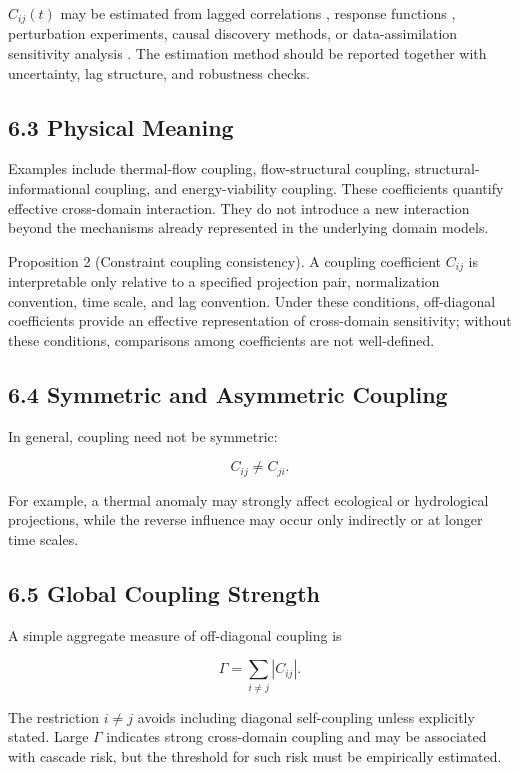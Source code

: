 \documentclass[aps,pre,reprint,superscriptaddress,nofootinbib]{revtex4-2}
\begin{document}
\(C_{ij}(t)\) may be estimated from lagged correlations \cite{Saltelli2008GSA}, response functions \cite{Saltelli2008GSA}, perturbation experiments, causal discovery methods, or data-assimilation sensitivity analysis \cite{Kalnay2003Assimilation}. The estimation method should be reported together with uncertainty, lag structure, and robustness checks.

\subsection{6.3 Physical Meaning}

Examples include thermal-flow coupling, flow-structural coupling, structural-informational coupling, and energy-viability coupling. These coefficients quantify effective cross-domain interaction. They do not introduce a new interaction beyond the mechanisms already represented in the underlying domain models.

Proposition 2 (Constraint coupling consistency). A coupling coefficient \(C_{ij}\) is interpretable only relative to a specified projection pair, normalization convention, time scale, and lag convention. Under these conditions, off-diagonal coefficients provide an effective representation of cross-domain sensitivity; without these conditions, comparisons among coefficients are not well-defined.

\subsection{6.4 Symmetric and Asymmetric Coupling}

In general, coupling need not be symmetric:

\[ C_{ij}\neq C_{ji}. \]

For example, a thermal anomaly may strongly affect ecological or hydrological projections, while the reverse influence may occur only indirectly or at longer time scales.

\subsection{6.5 Global Coupling Strength}

A simple aggregate measure of off-diagonal coupling is

\[ \Gamma=\sum_{i\neq j}|C_{ij}|. \]

The restriction \(i\neq j\) avoids including diagonal self-coupling unless explicitly stated. Large \(\Gamma\) indicates strong cross-domain coupling and may be associated with cascade risk, but the threshold for such risk must be empirically estimated.
\end{document}
